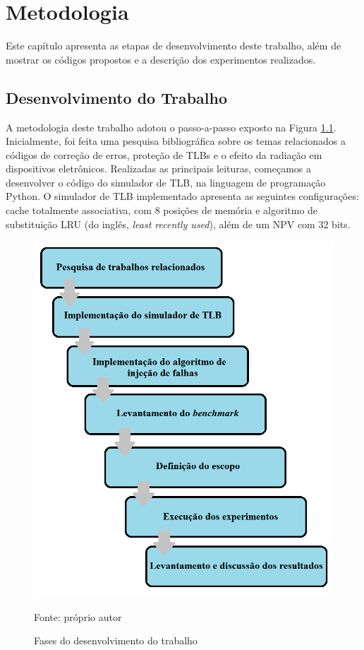 \chapter{Metodologia}
\label{cap:4}

Este capítulo apresenta as etapas de desenvolvimento deste trabalho, além de mostrar os códigos propostos e a descrição dos experimentos realizados.

\section{Desenvolvimento do Trabalho}

A metodologia deste trabalho adotou o passo-a-passo exposto na Figura \ref{fig:metodologia}. Inicialmente, foi feita uma pesquisa bibliográfica sobre os temas relacionados a códigos de correção de erros, proteção de TLBs e o efeito da radiação em dispositivos eletrônicos. Realizadas as principais leituras, começamos a desenvolver o código do simulador de TLB, na linguagem de programação Python. O simulador de TLB implementado apresenta as seguintes configurações: cache totalmente associativa, com 8 posições de memória e algoritmo de substituição LRU (do inglês, \textit{least recently used}), além de um NPV com 32 bits.

\begin{figure}[ht]
    \centering
    \includegraphics[scale=0.42]{figuras/metodologia.png}
    \caption{Fases do desenvolvimento do trabalho}{Fonte: próprio autor}
    \label{fig:metodologia}
\end{figure}

